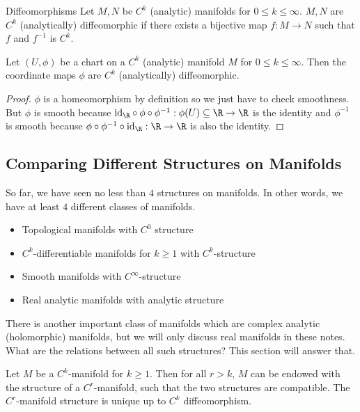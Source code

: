 \documentclass[a4paper]{article}
\begin{document}
\begin{defn}{Diffeomorphisms}{} Let $M,N$ be $C^k$ (analytic) manifolds for $0\leq k\leq\infty$. $M,N$ are $C^k$ (analytically) diffeomorphic if there exists a bijective map $f:M\to N$ such that $f$ and $f^{-1}$ is $C^k$. 
\end{defn}

\begin{prp}{}{} Let $(U,\phi)$ be a chart on a $C^k$ (analytic) manifold $M$ for $0\leq k\leq\infty$. Then the coordinate maps $\phi$ are $C^k$ (analytically) diffeomorphic. \tcbline
\begin{proof}
$\phi$ is a homeomorphism by definition so we just have to check smoothness. But $\phi$ is smooth because $\text{id}_\R\circ\phi\circ\phi^{-1}:\phi(U)\subseteq\R\to\R$ is the identity and $\phi^{-1}$ is smooth because $\phi\circ\phi^{-1}\circ\text{id}_\R:\R\to\R$ is also the identity. 
\end{proof}
\end{prp}

\subsection{Comparing Different Structures on Manifolds}
So far, we have seen no less than $4$ structures on manifolds. In other words, we have at least $4$ different classes of manifolds. 

\begin{itemize}
\item Topological manifolds with $C^0$ structure
\item $C^k$-differentiable manifolds for $k\geq 1$ with $C^k$-structure
\item Smooth manifolds with $C^\infty$-structure
\item Real analytic manifolds with analytic structure
\end{itemize}

There is another important class of manifolds which are complex analytic (holomorphic) manifolds, but we will only discuss real manifolds in these notes. What are the relations between all such structures? This section will answer that. 

\begin{thm}{}{} Let $M$ be a $C^k$-manifold for $k\geq 1$. Then for all $r>k$, $M$ can be endowed with the structure of a $C^r$-manifold, such that the two structures are compatible. The $C^r$-manifold structure is unique up to $C^k$ diffeomorphism. 
\end{thm}
\end{document}
